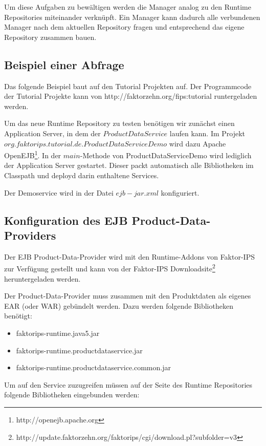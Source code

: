 \documentclass[headsepline=true, footsepline=true]{scrartcl}
\begin{document}
Um diese Aufgaben zu bewältigen werden die Manager analog zu den Runtime
Repositories miteinander verknüpft. Ein Manager kann dadurch alle verbundenen
Manager nach dem aktuellen Repository fragen und entsprechend das eigene
Repository zusammen bauen.

\subsection{Beispiel einer Abfrage}

Das folgende Beispiel baut auf den Tutorial Projekten auf. Der Programmcode der
Tutorial Projekte kann von http://faktorzehn.org/fips:tutorial runtergeladen
werden.

Um das neue Runtime Repository zu testen benötigen wir zunächst einen
Application Server, in dem der $ProductDataService$ laufen kann. Im Projekt
$org.faktorips.tutorial.de.ProductDataServiceDemo$ wird dazu Apache
OpenEJB\footnote{http://openejb.apache.org}. In der $main$-Methode von
ProductDataServiceDemo wird lediglich der Application Server gestartet. Dieser
packt automatisch alle Bibliotheken im Classpath und deployd darin enthaltene
Services.

Der Demoservice wird in der Datei $ejb-jar.xml$ konfiguriert. 




\subsection{Konfiguration des EJB Product-Data-Providers}

Der EJB Product-Data-Provider wird mit den Runtime-Addons von Faktor-IPS zur Verfügung gestellt und
kann von der Faktor-IPS Downloadsite\footnote{http://update.faktorzehn.org/faktorips/cgi/download.pl?subfolder=v3} heruntergeladen werden.

Der Product-Data-Provider muss zusammen mit den Produktdaten als eigenes EAR (oder WAR) gebündelt werden.
Dazu werden folgende Bibliotheken benötigt:
\begin{itemize}
	\item faktorips-runtime.java5.jar
	\item faktorips-runtime.productdataservice.jar
	\item faktorips-runtime.productdataservice.common.jar
\end{itemize}

Um auf den Service zuzugreifen müssen auf der Seite des Runtime Repositories
folgende Bibliotheken eingebunden werden:
\end{document}
